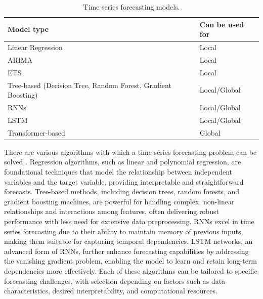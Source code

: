 \begin{table}[h]
    \centering
    \begin{tabular}{ll}
        \toprule
        \textbf{Model type}                                          & \textbf{Can be used for} \\
        \midrule
        Linear Regression                                            & Local                    \\
        \midrule
        \ac{ARIMA}                                                   & Local                    \\
        \midrule
        \ac{ETS}                                                     & Local                    \\
        \midrule
        Tree-based (Decision Tree, Random Forest, Gradient Boosting) & Local/Global             \\
        \midrule
        \ac{RNNs}                                                    & Local/Global             \\
        \midrule
        \ac{LSTM}                                                    & Local/Global             \\
        \midrule
        Transformer-based                                            & Global                   \\

        \bottomrule
    \end{tabular}
    \caption{Time series forecasting models.}
    \label{tab:timeseries_models}
\end{table}

There are various algorithms with which a time series forecasting problem can be
solved \parencite{salinas2020deepar}. Regression algorithms, such as linear and
polynomial regression, are foundational techniques that model the relationship
between independent variables and the target variable, providing interpretable
and straightforward forecasts. Tree-based methods, including decision trees,
random forests, and gradient boosting machines, are powerful for handling complex,
non-linear relationships and interactions among features, often delivering robust
performance with less need for extensive data preprocessing. \ac{RNNs} excel in
time series forecasting due to their ability to maintain memory of previous inputs,
making them suitable for capturing temporal dependencies. \ac{LSTM} networks, an
advanced form of \ac{RNNs}, further enhance forecasting capabilities by addressing
the vanishing gradient problem, enabling the model to learn and retain long-term
dependencies more effectively. Each of these algorithms can be tailored to specific
forecasting challenges, with selection depending on factors such as data characteristics,
desired interpretability, and computational resources.

